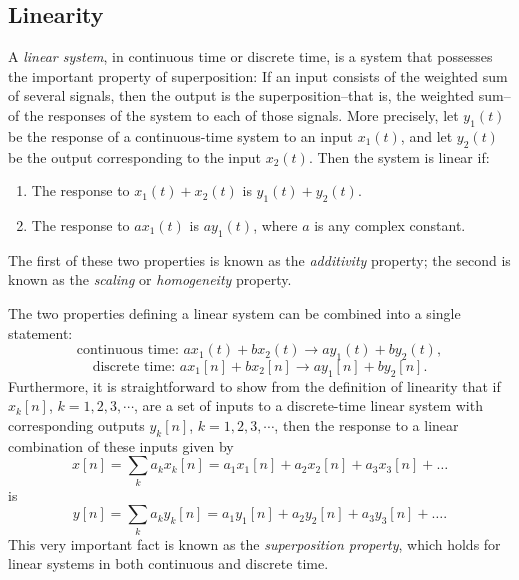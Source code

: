 \documentclass[a4paper,twoside]{book}
\begin{document}
\subsection{Linearity}

A \textit{linear system}, in continuous time or discrete time, is a system that possesses the important property of superposition: If an input consists of the weighted sum of several signals, then the output is the superposition--that is, the weighted sum--of the responses of the system to each of those signals. More precisely, let $y_1(t)$ be the response of a continuous-time system to an input $x_1(t)$, and let $y_2(t)$ be the output corresponding to the input $x_2(t)$. Then the system is linear if:
\begin{enumerate}
    \item The response to $x_1(t)+x_2(t)$ is $y_1(t)+y_2(t)$.
    \item The response to $ax_1(t)$ is $ay_1(t)$, where $a$ is any complex constant.
\end{enumerate}
The first of these two properties is known as the \textit{additivity} property; the second is known as the \textit{scaling} or \textit{homogeneity} property.

The two properties defining a linear system can be combined into a single statement:
\begin{equation}
    \text{continuous time: }ax_1(t)+bx_2(t)\to ay_1(t)+by_2(t),
    \label{1.121}
\end{equation}
\begin{equation}
    \text{discrete time: }ax_1[n]+bx_2[n]\to ay_1[n]+by_2[n].
    \label{1.122}
\end{equation}
Furthermore, it is straightforward to show from the definition of linearity that if $x_k[n]$, $k=1,2,3,\cdots$, are a set of inputs to a discrete-time linear system with corresponding outputs $y_k[n]$, $k=1,2,3,\cdots$, then the response to a linear combination of these inputs given by
\begin{equation}
    x[n]=\sum_{k}a_{k}x_{k}[n]=a_{1}x_{1}[n]+a_{2}x_{2}[n]+a_{3}x_{3}[n]+\ldots
    \label{1.123}
\end{equation}
is
\begin{equation}
    y[n]=\sum_{k}a_{k}y_{k}[n]=a_{1}y_{1}[n]+a_{2}y_{2}[n]+a_{3}y_{3}[n]+\ldots.
    \label{1.124}
\end{equation}
This very important fact is known as the \textit{superposition property}, which holds for linear systems in both continuous and discrete time.
\end{document}
